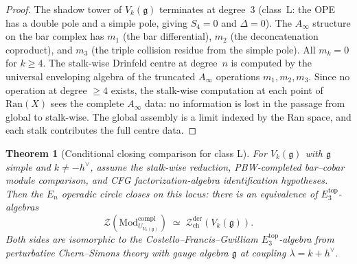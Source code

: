 \documentclass[11pt,reqno]{amsart}
\newtheorem{theorem}{Theorem}[section]
\theoremstyle{definition}
\theoremstyle{remark}
\providecommand{\cZ}{\mathcal{Z}}
\providecommand{\fg}{\mathfrak{g}}
\providecommand{\Ran}{\mathrm{Ran}}
\providecommand{\Ainf}{A_\infty}
\providecommand{\Ethree}{E_3}
\providecommand{\En}{E_n}
\begin{document}
\begin{proof}
The shadow tower of $V_k(\fg)$ terminates at degree~$3$
(class~L: the OPE has a double pole and a simple pole,
giving $S_4 = 0$ and $\Delta = 0$). The $\Ainf$ structure
on the bar complex has $m_1$ (the bar differential),
$m_2$ (the deconcatenation coproduct), and $m_3$ (the triple
collision residue from the simple pole). All $m_k = 0$ for
$k \ge 4$. The stalk-wise Drinfeld centre at degree~$n$
is computed by the universal enveloping algebra of the
truncated $\Ainf$ operations $m_1, m_2, m_3$. Since no
operation at degree $\ge 4$ exists, the stalk-wise
computation at each point of $\Ran(X)$ sees the complete
$\Ainf$ data: no information is lost in the passage from
global to stalk-wise. The global assembly is a limit
indexed by the Ran space, and each stalk contributes the
full centre data.
\end{proof}

\begin{theorem}[Conditional closing comparison for class L]
\label{thm:e-closing-class-l}
For $V_k(\fg)$ with $\fg$ simple and $k \neq -h^\vee$, assume the
stalk-wise reduction, PBW-completed bar--cobar module comparison, and
CFG factorization-algebra identification hypotheses. Then the
\(\En\) operadic circle closes on this locus: there is an equivalence
of \(\Ethree^{\mathrm{top}}\)-algebras
\begin{equation}\label{eq:e-closing-class-l}
\mathcal Z(\mathrm{Mod}^{\mathrm{compl}}_{U_{V_k(\fg)}})
\;\simeq\;
\cZ^{\mathrm{der}}_{\mathrm{ch}}(V_k(\fg)).
\end{equation}
Both sides are isomorphic to the Costello--Francis--Gwilliam
$\Ethree^{\mathrm{top}}$-algebra from perturbative
Chern--Simons theory with gauge algebra $\fg$ at coupling
$\lambda = k + h^\vee$.
\end{theorem}
\end{document}
